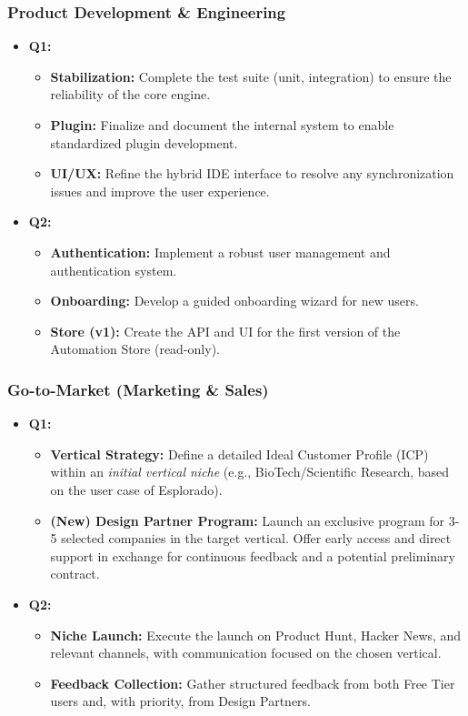 \documentclass[11pt, a4paper, oneside]{article}
\begin{document}
\subsubsection*{Product Development \& Engineering}
\begin{itemize}[leftmargin=*]
    \item \textbf{Q1:}
    \begin{itemize}
        \item \textbf{Stabilization:} Complete the test suite (unit, integration) to ensure the reliability of the core engine.
        \item \textbf{Plugin:} Finalize and document the internal system to enable standardized plugin development.
        \item \textbf{UI/UX:} Refine the hybrid IDE interface to resolve any synchronization issues and improve the user experience.
    \end{itemize}
    \item \textbf{Q2:}
    \begin{itemize}
        \item \textbf{Authentication:} Implement a robust user management and authentication system.
        \item \textbf{Onboarding:} Develop a guided onboarding wizard for new users.
        \item \textbf{Store (v1):} Create the API and UI for the first version of the Automation Store (read-only).
    \end{itemize}
\end{itemize}

\subsubsection*{Go-to-Market (Marketing \& Sales)}
\begin{itemize}[leftmargin=*]
    \item \textbf{Q1:}
    \begin{itemize}
        \item \textbf{Vertical Strategy:} Define a detailed Ideal Customer Profile (ICP) within an \textit{initial vertical niche} (e.g., BioTech/Scientific Research, based on the user case of Esplorado).
        \item \textbf{(New) Design Partner Program:} Launch an exclusive program for 3-5 selected companies in the target vertical. Offer early access and direct support in exchange for continuous feedback and a potential preliminary contract.
    \end{itemize}
    \item \textbf{Q2:}
    \begin{itemize}
        \item \textbf{Niche Launch:} Execute the launch on Product Hunt, Hacker News, and relevant channels, with communication focused on the chosen vertical.
        \item \textbf{Feedback Collection:} Gather structured feedback from both Free Tier users and, with priority, from Design Partners.
    \end{itemize}
\end{itemize}
\end{document}
